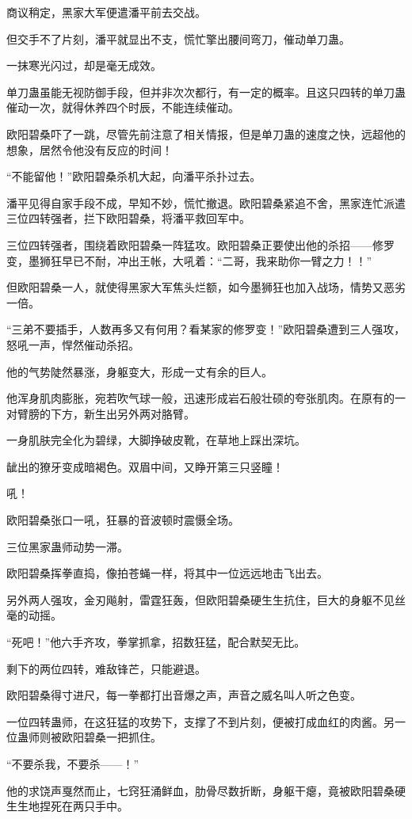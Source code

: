\begin{this_body}
商议稍定，黑家大军便遣潘平前去交战。

但交手不了片刻，潘平就显出不支，慌忙擎出腰间弯刀，催动单刀蛊。

一抹寒光闪过，却是毫无成效。

单刀蛊虽能无视防御手段，但并非次次都行，有一定的概率。且这只四转的单刀蛊催动一次，就得休养四个时辰，不能连续催动。

欧阳碧桑吓了一跳，尽管先前注意了相关情报，但是单刀蛊的速度之快，远超他的想象，居然令他没有反应的时间！

“不能留他！”欧阳碧桑杀机大起，向潘平杀扑过去。

潘平见得自家手段不成，早知不妙，慌忙撤退。欧阳碧桑紧追不舍，黑家连忙派遣三位四转强者，拦下欧阳碧桑，将潘平救回军中。

三位四转强者，围绕着欧阳碧桑一阵猛攻。欧阳碧桑正要使出他的杀招——修罗变，墨狮狂早已不耐，冲出王帐，大吼着：“二哥，我来助你一臂之力！！”

但欧阳碧桑一人，就使得黑家大军焦头烂额，如今墨狮狂也加入战场，情势又恶劣一倍。

“三弟不要插手，人数再多又有何用？看某家的修罗变！”欧阳碧桑遭到三人强攻，怒吼一声，悍然催动杀招。

他的气势陡然暴涨，身躯变大，形成一丈有余的巨人。

他浑身肌肉膨胀，宛若吹气球一般，迅速形成岩石般壮硕的夸张肌肉。在原有的一对臂膀的下方，新生出另外两对胳臂。

一身肌肤完全化为碧绿，大脚挣破皮靴，在草地上踩出深坑。

龇出的獠牙变成暗褐色。双眉中间，又睁开第三只竖瞳！

吼！

欧阳碧桑张口一吼，狂暴的音波顿时震慑全场。

三位黑家蛊师动势一滞。

欧阳碧桑挥拳直捣，像拍苍蝇一样，将其中一位远远地击飞出去。

另外两人强攻，金刃飚射，雷霆狂轰，但欧阳碧桑硬生生抗住，巨大的身躯不见丝毫的动摇。

“死吧！”他六手齐攻，拳掌抓拿，招数狂猛，配合默契无比。

剩下的两位四转，难敌锋芒，只能避退。

欧阳碧桑得寸进尺，每一拳都打出音爆之声，声音之威名叫人听之色变。

一位四转蛊师，在这狂猛的攻势下，支撑了不到片刻，便被打成血红的肉酱。另一位蛊师则被欧阳碧桑一把抓住。

“不要杀我，不要杀——！”

他的求饶声戛然而止，七窍狂涌鲜血，肋骨尽数折断，身躯干瘪，竟被欧阳碧桑硬生生地捏死在两只手中。


\end{this_body}
